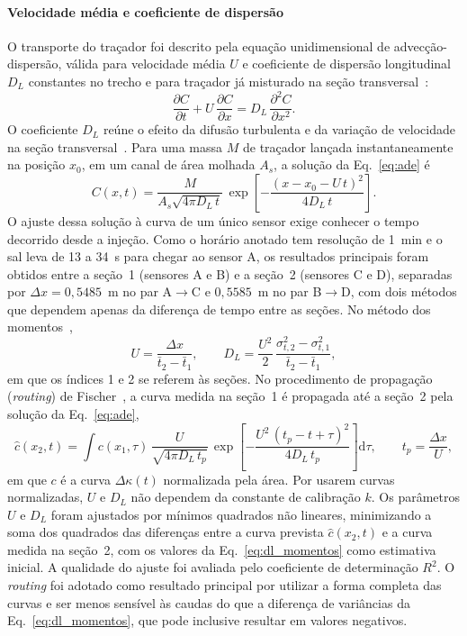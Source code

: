 \documentclass[12pt,a4paper]{article}
\begin{document}
\paragraph{Velocidade média e coeficiente de dispersão}
O transporte do traçador foi descrito pela equação unidimensional de advecção-dispersão, válida para velocidade média $U$ e coeficiente de dispersão longitudinal $D_L$ constantes no trecho e para traçador já misturado na seção transversal~\cite{fischer1979}:
\begin{equation}
  \frac{\partial C}{\partial t} + U\,\frac{\partial C}{\partial x} = D_L\,\frac{\partial^{2} C}{\partial x^{2}}.
  \label{eq:ade}
\end{equation}
O coeficiente $D_L$ reúne o efeito da difusão turbulenta e da variação de velocidade na seção transversal~\cite{fischer1979}. Para uma massa $M$ de traçador lançada instantaneamente na posição $x_0$, em um canal de área molhada $A_s$, a solução da Eq.~\eqref{eq:ade} é~\cite{fischer1979}
\begin{equation}
  C(x,t) = \frac{M}{A_s\sqrt{4\pi D_L\,t}}\,\exp\!\left[-\frac{(x - x_0 - U\,t)^{2}}{4 D_L\,t}\right].
  \label{eq:gauss}
\end{equation}
O ajuste dessa solução à curva de um único sensor exige conhecer o tempo decorrido desde a injeção. Como o horário anotado tem resolução de 1~min e o sal leva de 13 a 34~s para chegar ao sensor A, os resultados principais foram obtidos entre a seção~1 (sensores A e B) e a seção~2 (sensores C e D), separadas por $\Delta x = 0{,}5485$~m no par A$\rightarrow$C e $0{,}5585$~m no par B$\rightarrow$D, com dois métodos que dependem apenas da diferença de tempo entre as seções. No método dos momentos~\cite{fischer1979,devens2006},
\begin{equation}
  U = \frac{\Delta x}{\bar{t}_2 - \bar{t}_1}, \qquad
  D_L = \frac{U^{2}}{2}\,\frac{\sigma_{t,2}^{2} - \sigma_{t,1}^{2}}{\bar{t}_2 - \bar{t}_1},
  \label{eq:dl_momentos}
\end{equation}
em que os índices 1 e 2 se referem às seções. No procedimento de propagação (\emph{routing}) de Fischer~\cite{fischer1968}, a curva medida na seção~1 é propagada até a seção~2 pela solução da Eq.~\eqref{eq:ade},
\begin{equation}
  \hat{c}(x_2,t) = \int c(x_1,\tau)\,\frac{U}{\sqrt{4\pi D_L\,t_p}}\,
  \exp\!\left[-\frac{U^{2}\,(t_p - t + \tau)^{2}}{4 D_L\,t_p}\right]\mathrm{d}\tau,
  \qquad t_p = \frac{\Delta x}{U},
  \label{eq:routing}
\end{equation}
em que $c$ é a curva $\Delta\kappa(t)$ normalizada pela área. Por usarem curvas normalizadas, $U$ e $D_L$ não dependem da constante de calibração $k$. Os parâmetros $U$ e $D_L$ foram ajustados por mínimos quadrados não lineares, minimizando a soma dos quadrados das diferenças entre a curva prevista $\hat{c}(x_2,t)$ e a curva medida na seção~2, com os valores da Eq.~\eqref{eq:dl_momentos} como estimativa inicial. A qualidade do ajuste foi avaliada pelo coeficiente de determinação $R^2$. O \emph{routing} foi adotado como resultado principal por utilizar a forma completa das curvas e ser menos sensível às caudas do que a diferença de variâncias da Eq.~\eqref{eq:dl_momentos}, que pode inclusive resultar em valores negativos.
\end{document}
